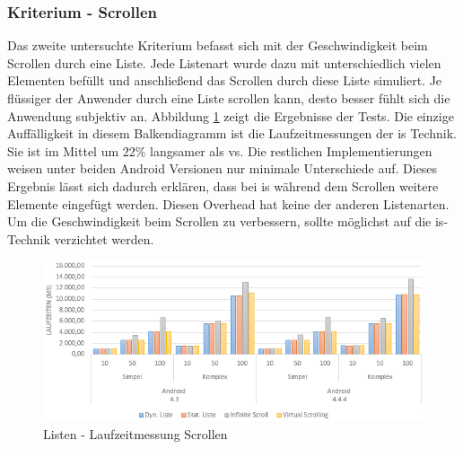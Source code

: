 \subsubsection{Kriterium - Scrollen}
Das zweite untersuchte Kriterium befasst sich mit der Geschwindigkeit beim Scrollen durch eine Liste. Jede Listenart wurde dazu mit unterschiedlich vielen Elementen befüllt und anschließend das Scrollen durch diese Liste simuliert. Je flüssiger der Anwender durch eine Liste scrollen kann, desto besser fühlt sich die Anwendung subjektiv an. Abbildung \ref{lists-runtime-scroll} zeigt die Ergebnisse der Tests. Die einzige Auffälligkeit in diesem Balkendiagramm ist die Laufzeitmessungen der \gls{is} Technik. Sie ist im Mittel um 22\% langsamer als \gls{vs}. Die restlichen Implementierungen weisen unter beiden Android Versionen nur minimale Unterschiede auf. Dieses Ergebnis lässt sich dadurch erklären, dass bei \gls{is} während dem Scrollen weitere Elemente eingefügt werden. Diesen Overhead hat keine der anderen Listenarten. Um die Geschwindigkeit beim Scrollen zu verbessern, sollte möglichst auf die \gls{is}-Technik verzichtet werden.
\begin{figure}[h]
	\centering
	\includegraphics[scale=0.7]{Bilder/Diagramme/List-Scrollen.png}
	\caption{Listen - Laufzeitmessung Scrollen}
	\label{lists-runtime-scroll}
\end{figure}

